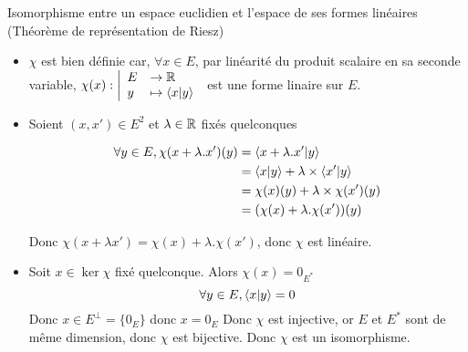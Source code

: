 \documentclass{article}
\renewenvironment{question_kholle}[2][ ]
{
	\subsection{\texorpdfstring{#2}{}}
	\notblank{#1}
	{
		\noindent #1
		\bigbreak
	}
	{}
	\begin{proof}
}
{
	\end{proof}
}
\begin{document}
\begin{question_kholle}{Isomorphisme entre un espace euclidien et l'espace de ses formes linéaires (Théorème de représentation de Riesz)}
  \begin{itemize}[label=$\star$]
    \item $\chi$ est bien définie car, $\forall x \in E$, par linéarité du produit scalaire en sa seconde variable, $\chi(x): \left|\begin{array}{ll} E &\to \mathbb R \\ y &\mapsto \braket{ x | y }  \end{array}\right.$ est une forme linaire sur $E$.


    \item Soient $(x, x') \in E^{2}$ et $\lambda \in \mathbb R$ fixés quelconques


          \begin{align*}
            \forall y \in E,  \chi(x + \lambda .x')(y) & = \braket{ x+\lambda.x' | y }                        \\
                                                       & = \braket{ x | y } + \lambda \times\braket{ x' | y } \\
                                                       & = \chi(x)(y) + \lambda \times \chi(x')(y)            \\
                                                       & = (\chi(x) + \lambda . \chi(x') )(y)
          \end{align*}

          Donc $\chi(x+\lambda x') = \chi(x) + \lambda.\chi(x')$, donc $\chi$ est linéaire.

    \item Soit $x \in \ker \chi$ fixé quelconque.
          Alors $\chi (x) = 0_{E^{*}}$
          $$\forall y \in E, \braket{ x | y } = 0$$
          Donc $x \in E^{\perp} = \{ 0_{E} \}$ donc $x = 0_{E}$
          Donc $\chi$ est injective, or $E$ et $E^{*}$ sont de même dimension, donc $\chi$ est bijective.
          Donc $\chi$ est un isomorphisme.
  \end{itemize}
\end{question_kholle}
\end{document}
